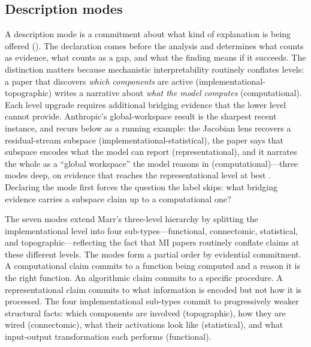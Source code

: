 \documentclass{article}
\begin{document}
\subsection{Description modes}
\label{sec:description-modes}

A description mode is a commitment about what kind of explanation is being offered (). The declaration comes before the analysis and determines what counts as evidence, what counts as a gap, and what the finding means if it succeeds. The distinction matters because mechanistic interpretability routinely conflates levels: a paper that discovers \emph{which components} are active (implementational-topographic) writes a narrative about \emph{what the model computes} (computational). Each level upgrade requires additional bridging evidence that the lower level cannot provide. Anthropic's global-workspace result is the sharpest recent instance, and recurs below as a running example: the Jacobian lens recovers a residual-stream subspace (implementational-statistical), the paper says that subspace encodes what the model can report (representational), and it narrates the whole as a ``global workspace'' the model reasons in (computational)---three modes deep, on evidence that reaches the representational level at best \citep{gurnee2026verbalizable}. Declaring the mode first forces the question the label skips: what bridging evidence carries a subspace claim up to a computational one?

The seven modes extend Marr's three-level hierarchy \citep{marr1982vision} by splitting the implementational level into four sub-types---functional, connectomic, statistical, and topographic---reflecting the fact that MI papers routinely conflate claims at these different levels. The modes form a partial order by evidential commitment. A computational claim commits to a function being computed and a reason it is the right function. An algorithmic claim commits to a specific procedure. A representational claim commits to what information is encoded but not how it is processed. The four implementational sub-types commit to progressively weaker structural facts: which components are involved (topographic), how they are wired (connectomic), what their activations look like (statistical), and what input-output transformation each performs (functional).
\end{document}
